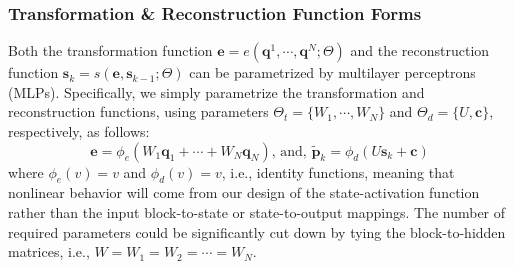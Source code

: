 \documentclass[smallabstract,smallcaptions]{dccpaper}
\begin{document}
\subsubsection{Transformation \& Reconstruction Function Forms}
Both the transformation function $\mathbf{e} = e(\mathbf{q}^1, \cdots, \mathbf{q}^N ; \Theta)$ and the reconstruction function $\mathbf{s}_k = s(\mathbf{e}, \mathbf{s}_{k-1} ; \Theta)$ can be parametrized by multilayer perceptrons (MLPs).
Specifically, we simply parametrize the transformation and reconstruction functions, using parameters $\Theta_t = \{W_1, \cdots, W_N\}$ and $\Theta_d = \{U, \mathbf{c}\}$, respectively, as follows:
\begin{equation}
\mathbf{e} = \phi_e(W_1 \mathbf{q}_1 + \cdots + W_N \mathbf{q}_N) \mbox{, and, }
\widetilde{\mathbf{p}}_k = \phi_d(U \mathbf{s}_k + \mathbf{c})
\nonumber %
\end{equation}
where $\phi_e(v) = v$ and $\phi_d(v) = v$, i.e., identity functions, meaning that nonlinear behavior will come from our design of the state-activation function rather than the input block-to-state or state-to-output mappings. The number of required parameters could be significantly cut down by tying the block-to-hidden matrices, i.e., $W = W_1 = W_2 = \cdots = W_N$.

\end{document}
